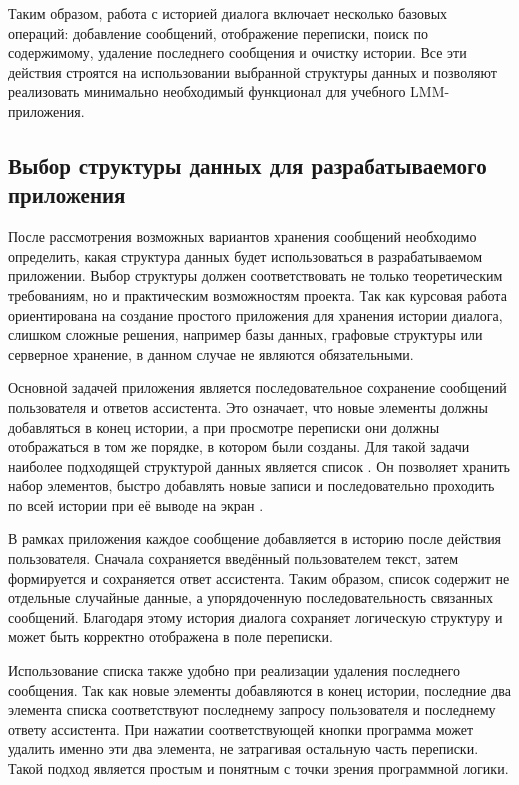 \documentclass[12pt,a4paper]{article}
\begin{document}
Таким образом, работа с историей диалога включает несколько базовых операций: добавление сообщений, отображение переписки, поиск по содержимому, удаление последнего сообщения и очистку истории. Все эти действия строятся на использовании выбранной структуры данных и позволяют реализовать минимально необходимый функционал для учебного LMM-приложения.

\subsection{Выбор структуры данных для разрабатываемого приложения}

После рассмотрения возможных вариантов хранения сообщений необходимо определить, какая структура данных будет использоваться в разрабатываемом приложении. Выбор структуры должен соответствовать не только теоретическим требованиям, но и практическим возможностям проекта. Так как курсовая работа ориентирована на создание простого приложения для хранения истории диалога, слишком сложные решения, например базы данных, графовые структуры или серверное хранение, в данном случае не являются обязательными.

Основной задачей приложения является последовательное сохранение сообщений пользователя и ответов ассистента. Это означает, что новые элементы должны добавляться в конец истории, а при просмотре переписки они должны отображаться в том же порядке, в котором были созданы. Для такой задачи наиболее подходящей структурой данных является список \cite{ref1,ref2}. Он позволяет хранить набор элементов, быстро добавлять новые записи и последовательно проходить по всей истории при её выводе на экран \cite{ref1}.

В рамках приложения каждое сообщение добавляется в историю после действия пользователя. Сначала сохраняется введённый пользователем текст, затем формируется и сохраняется ответ ассистента. Таким образом, список содержит не отдельные случайные данные, а упорядоченную последовательность связанных сообщений. Благодаря этому история диалога сохраняет логическую структуру и может быть корректно отображена в поле переписки.

Использование списка также удобно при реализации удаления последнего сообщения. Так как новые элементы добавляются в конец истории, последние два элемента списка соответствуют последнему запросу пользователя и последнему ответу ассистента. При нажатии соответствующей кнопки программа может удалить именно эти два элемента, не затрагивая остальную часть переписки. Такой подход является простым и понятным с точки зрения программной логики.
\end{document}
